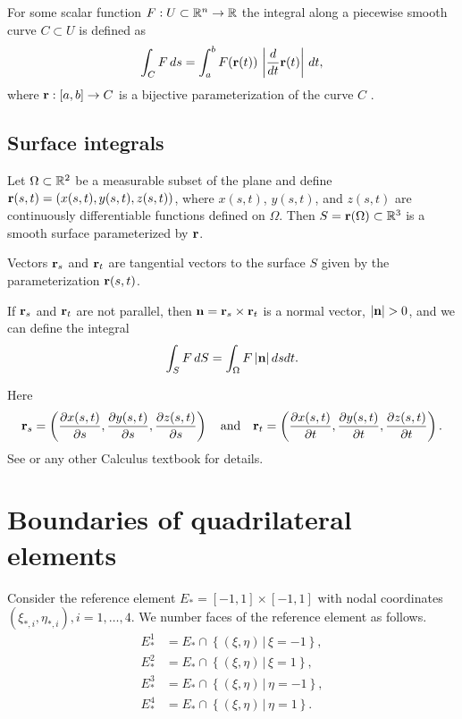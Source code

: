 \documentclass[11pt]{article}
\begin{document}
For some scalar function $F : U \subset \mathbb{R}^{n} \to \mathbb{R}$
the integral along a piecewise smooth curve $C \subset U$ is defined as
\begin{equation}
\label{eq:1}
\int_{C} F\, ds = \int_{a}^{b} F(\mathbf{r}(t))\, \left| \frac{d}{dt}\mathbf{r}(t) \right|\, dt,
\end{equation}
where $\mathbf{r}: [a, b] \to C$ is a bijective parameterization of the curve
$C$ \cite{Nikolsky1977}.

\subsection{Surface integrals}
\label{sec-2-2}

Let $\Omega \subset \mathbb{R}^{2}$ be a measurable subset of the
plane and define $\mathbf{r}(s,t) = (x(s,t), y(s,t), z(s,t))$, where $x(s,
t)$, $y(s, t)$, and $z(s, t)$ are continuously differentiable
functions defined on $\Omega$. Then $S = \mathbf{r}(\Omega) \subset
\mathbb{R}^{3}$ is a smooth surface parameterized by $\mathbf{r}$.

Vectors $\mathbf{r}_{s}$ and $\mathbf{r}_{t}$ are tangential vectors to the surface $S$
given by the parameterization $\mathbf{r}(s,t)$.

If $\mathbf{r}_{s}$ and $\mathbf{r}_{t}$ are not parallel, then $\mathbf{n} = \mathbf{r}_{s} \times \mathbf{r}_{t}$ is
a normal vector, $| \mathbf{n} | > 0$, and we can define
the integral
\begin{equation}
\label{eq:2}
\int_{S} F\, dS = \int_{\Omega} F\, |\mathbf{n}|\, ds dt.
\end{equation}

Here
\begin{equation}
\label{eq:3}
\mathbf{r}_{s} = \left(\frac{\partial x(s,t)}{\partial s}, \frac{\partial y(s,t)}{\partial s}, \frac{\partial z(s,t)}{\partial s}\right) \quad \text{and} \quad
\mathbf{r}_{t} = \left(\frac{\partial x(s,t)}{\partial t}, \frac{\partial y(s,t)}{\partial t}, \frac{\partial z(s,t)}{\partial t}\right).
\end{equation}
See \cite{Nikolsky1977} or any other Calculus textbook for details.


\section{Boundaries of quadrilateral elements}
\label{sec-3}
\newcommand{\F}[2]{#1_{#2}^{1}}
\newcommand{\Fk}[1]{\F{#1}{k}}
\newcommand{\Fr}[1]{\F{#1}{*}}
\newcommand{\T}{\Fr{\R}(t)}
\newcommand{\Tq}{\Fr{\R}(t_{q})}

Consider the reference element $E_{*} = [-1, 1] \times [-1,1]$ with nodal coordinates
$(\xi_{*,i}, \eta_{*,i}), i=1,\dots,4$.
We number faces of the reference element as follows.
\begin{equation}
\label{eq:4}
\begin{aligned}
E_{*}^{1} &=  E_{*} \cap \left \{ (\xi, \eta)\, |\, \xi = -1 \right \},\\
E_{*}^{2} &=  E_{*} \cap \left \{ (\xi, \eta)\, |\, \xi = 1  \right \},\\
E_{*}^{3} &=  E_{*} \cap \left \{ (\xi, \eta)\, |\, \eta = -1 \right \},\\
E_{*}^{4} &=  E_{*} \cap \left \{ (\xi, \eta)\, |\, \eta = 1  \right \}.
\end{aligned}
\end{equation}
\end{document}
